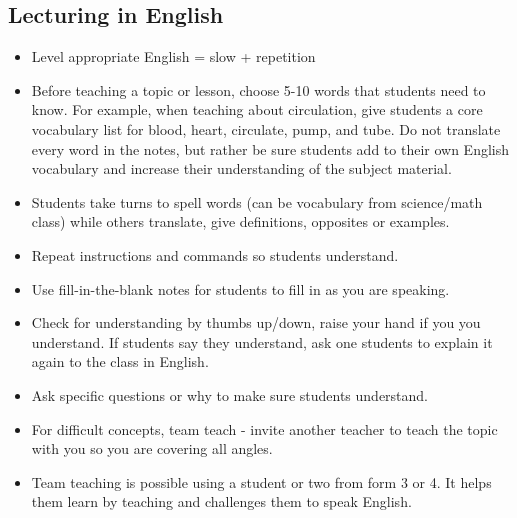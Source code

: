 \subsection{Lecturing in English}
\begin{itemize}
\item Level appropriate English = slow + repetition 
\item Before teaching a topic or lesson, choose 5-10 words that students
need to know. For example, when teaching about circulation, give students
a core vocabulary list for blood, heart, circulate, pump, and tube.
Do not translate every word in the notes, but rather be sure students
add to their own English vocabulary and increase their understanding
of the subject material. 
\item Students take turns to spell words (can be vocabulary from science/math
class) while others translate, give definitions, opposites or examples. 
\item Repeat instructions and commands so students understand.  
\item Use fill-in-the-blank notes for students to fill in as you are speaking.
 
\item Check for understanding by thumbs up/down, raise your hand if you
you understand. If students say they understand, ask one students
to explain it again to the class in English.  
\item Ask specific questions or why to make sure students understand.  
\item For difficult concepts, team teach - invite another teacher to teach
the topic with you so you are covering all angles.  
\item Team teaching is possible using a student or two from form 3 or 4.
It helps them learn by teaching and challenges them to speak English.
 

\end{itemize}

